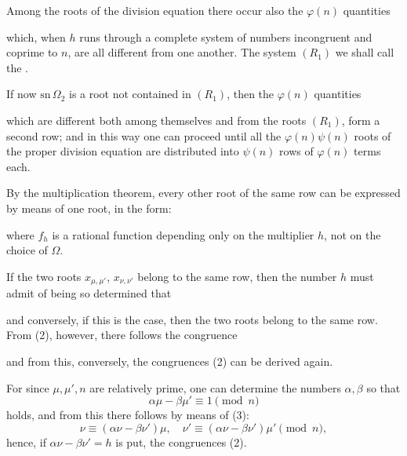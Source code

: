 Among the roots of the division equation there occur also the
$\varphi(n)$ quantities

which, when $h$ runs through a complete system of numbers incongruent
and coprime to $n$, are all different from one another. The system
$(R_1)$ we shall call the .

If now $\mathrm{sn}\,\Omega_2$ is a root not contained in $(R_1)$, then the
$\varphi(n)$ quantities

which are different both among themselves and from the roots $(R_1)$,
form a second row; and in this way one can proceed until all the
$\varphi(n)\psi(n)$ roots of the proper division equation are distributed
into $\psi(n)$ rows of $\varphi(n)$ terms each.

By the multiplication theorem, every other root of the same row can be
expressed  by means of one root, in the form:

where $f_h$ is a rational function depending only on the multiplier $h$,
not on the choice of $\Omega$.

If the two roots $x_{\mu,\mu'}$, $x_{\nu,\nu'}$ belong to the same row, then the number $h$ must admit of being so determined that

and conversely, if this is the case, then the two roots belong to the
same row. From (2), however, there follows the congruence

and from this, conversely, the congruences (2) can be derived again.

For since $\mu, \mu', n$ are relatively prime, one can determine the
numbers $\alpha, \beta$ so that
\[
\alpha\mu - \beta\mu' \equiv 1 \pmod{n}
\]
holds, and from this there follows by means of (3):
\[
\nu \equiv (\alpha\nu - \beta\nu')\mu, \quad \nu' \equiv (\alpha\nu - \beta\nu')\mu' \pmod{n},
\]
hence, if $\alpha\nu - \beta\nu' = h$ is put, the congruences (2).

